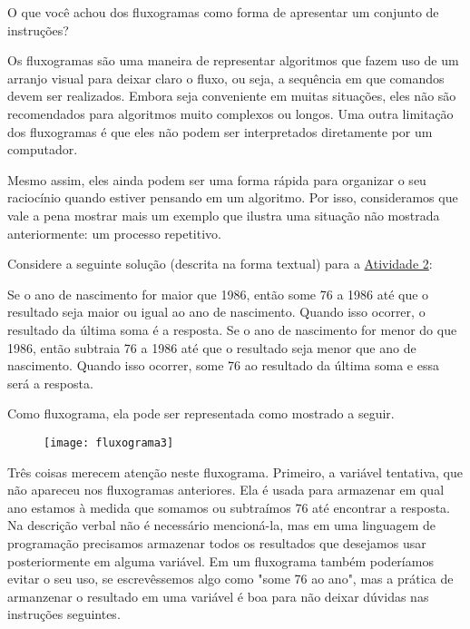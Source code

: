 \begin{reflection}
O que você achou dos fluxogramas como forma de apresentar um conjunto de instruções?
\end{reflection}

\label{comp-arr2}

Os fluxogramas são uma maneira de representar algoritmos que fazem uso de um arranjo visual para deixar claro o fluxo, ou seja, a sequência em que comandos devem ser realizados. Embora seja conveniente em muitas situações, eles não são recomendados para algoritmos muito complexos ou longos. Uma outra limitação dos fluxogramas é que eles não podem ser interpretados diretamente por um computador.

Mesmo assim, eles ainda podem ser uma forma rápida para organizar o seu raciocínio quando estiver pensando em um algoritmo. Por isso, consideramos que vale a pena mostrar mais um exemplo que ilustra uma situação não mostrada anteriormente: um processo repetitivo.

Considere a seguinte solução (descrita na forma textual) para a \hyperref[comp-task2]{Atividade 2}:

Se o ano de nascimento for maior que 1986, então some 76 a 1986 até que o resultado seja maior ou igual ao ano de nascimento. Quando isso ocorrer, o resultado da última soma é a resposta.
Se o ano de nascimento for menor do que 1986, então subtraia 76 a 1986 até que o resultado seja menor que ano de nascimento. Quando isso ocorrer, some 76 ao resultado da última soma e essa será a resposta.

Como fluxograma, ela pode ser representada como mostrado a seguir.

\begin{figure}[H]
\centering
\texttt{[image: fluxograma3]}
\end{figure}

Três coisas merecem atenção neste fluxograma.
Primeiro, a variável tentativa, que não apareceu nos fluxogramas anteriores. Ela é usada para armazenar em qual ano estamos à medida que somamos ou subtraímos 76 até encontrar a resposta. Na descrição verbal não é necessário mencioná-la, mas em uma linguagem de programação precisamos armazenar todos os resultados que desejamos usar posteriormente em alguma variável. Em um fluxograma também poderíamos evitar o seu uso, se escrevêssemos algo como "some 76 ao ano", mas a prática de armanzenar o resultado em uma variável é boa para não deixar dúvidas nas instruções seguintes.

